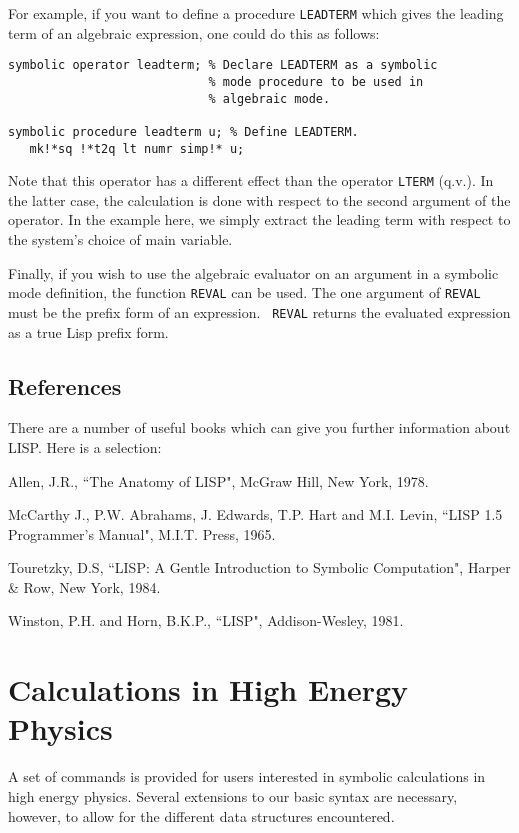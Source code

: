 For example, if you want to define a procedure {\tt LEADTERM} which gives the
leading term of an algebraic expression, one could do this as follows:
\begin{verbatim}
symbolic operator leadterm; % Declare LEADTERM as a symbolic
                            % mode procedure to be used in
                            % algebraic mode.

symbolic procedure leadterm u; % Define LEADTERM.
   mk!*sq !*t2q lt numr simp!* u;
\end{verbatim}
Note that this operator has a different effect than the operator {\tt LTERM}
 (q.v.).  In the latter case, the calculation is done
with respect to the second argument of the operator.  In the example here,
we simply extract the leading term with respect to the system's choice of
main variable.

Finally, if you wish to use the algebraic evaluator on an argument in a
symbolic mode definition, the function {\tt REVAL} can be used.  The one
argument of {\tt REVAL} must be the prefix form of an expression. {\tt
REVAL} returns the evaluated expression as a true Lisp prefix form.

\section{References}

There are a number of useful books which can give you further information
about LISP. Here is a selection:

 Allen, J.R., ``The Anatomy of LISP", McGraw Hill, New York, 1978.

 McCarthy J., P.W. Abrahams, J. Edwards, T.P. Hart and
     M.I. Levin, ``LISP 1.5 Programmer's Manual", M.I.T. Press, 1965.

 Touretzky, D.S, ``{LISP}: A Gentle Introduction to Symbolic Computation",
 Harper \& Row, New York, 1984.

 Winston, P.H. and Horn, B.K.P., ``LISP", Addison-Wesley, 1981.

\chapter{Calculations in High Energy Physics}

A set of {\REDUCE} commands is provided for users interested in symbolic
calculations in high energy physics. Several extensions to our basic
syntax are necessary, however, to allow for the different data structures
encountered.

